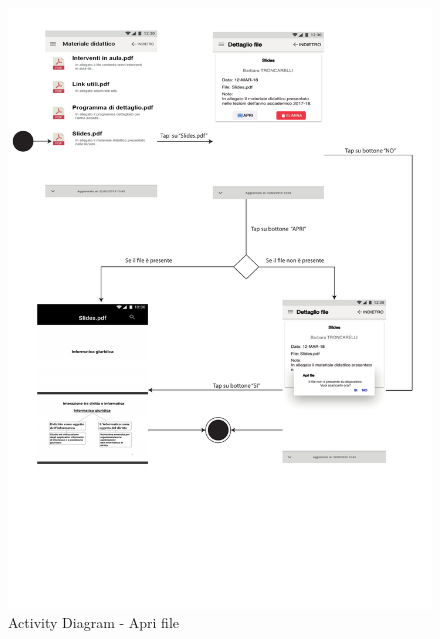 \begin{figure}
	\centering
	\includegraphics[width=6in]{imgs/gruppo1/activity_diagrams/AD16_apri_file.pdf}
	\caption{Activity Diagram - Apri file}
	\label{diag:apriFileAD}
\end{figure}
\newpage

